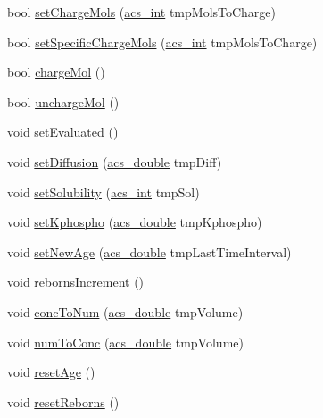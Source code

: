 \begin{DoxyCompactItemize}
\item 
bool \hyperlink{classspecies_a27f9852312659597efe7925124152286}{set\-Charge\-Mols} (\hyperlink{acs__headers_8h_a8d277355641a098190360234e2ebde35}{acs\-\_\-int} tmp\-Mols\-To\-Charge)
\item 
bool \hyperlink{classspecies_a088763fc6b6279040920d219f314c90e}{set\-Specific\-Charge\-Mols} (\hyperlink{acs__headers_8h_a8d277355641a098190360234e2ebde35}{acs\-\_\-int} tmp\-Mols\-To\-Charge)
\item 
bool \hyperlink{classspecies_adc36fb991695aed6503b8ed82e06bca5}{charge\-Mol} ()
\item 
bool \hyperlink{classspecies_acf8588148932adb86229eec28f7cde7c}{uncharge\-Mol} ()
\item 
void \hyperlink{classspecies_a089da38f8016bd588fa262cd836d1c4d}{set\-Evaluated} ()
\item 
void \hyperlink{classspecies_ab4b4adbc3c26e3a8c81a090c9d1330e3}{set\-Diffusion} (\hyperlink{acs__headers_8h_ab776853a005fcbf56af0424a2a4dd607}{acs\-\_\-double} tmp\-Diff)
\item 
void \hyperlink{classspecies_a27c2d0448e1f56e0962132d8d360fc07}{set\-Solubility} (\hyperlink{acs__headers_8h_a8d277355641a098190360234e2ebde35}{acs\-\_\-int} tmp\-Sol)
\item 
void \hyperlink{classspecies_a4d33fdb252e1884841f9c671ce25973c}{set\-Kphospho} (\hyperlink{acs__headers_8h_ab776853a005fcbf56af0424a2a4dd607}{acs\-\_\-double} tmp\-Kphospho)
\item 
void \hyperlink{classspecies_aa73ab15fb28aefd3b0c6b19e7c9bb944}{set\-New\-Age} (\hyperlink{acs__headers_8h_ab776853a005fcbf56af0424a2a4dd607}{acs\-\_\-double} tmp\-Last\-Time\-Interval)
\item 
void \hyperlink{classspecies_a90d5fc1d90637f2245e8b0ecf228ddfa}{reborns\-Increment} ()
\item 
void \hyperlink{classspecies_a9842732a5dbe0eb67e24148b5d7ae4a2}{conc\-To\-Num} (\hyperlink{acs__headers_8h_ab776853a005fcbf56af0424a2a4dd607}{acs\-\_\-double} tmp\-Volume)
\item 
void \hyperlink{classspecies_a23c19a53390142ba690d0f3db0520d05}{num\-To\-Conc} (\hyperlink{acs__headers_8h_ab776853a005fcbf56af0424a2a4dd607}{acs\-\_\-double} tmp\-Volume)
\item 
void \hyperlink{classspecies_a911d4db36e84690d19abb2902a734524}{reset\-Age} ()
\item 
void \hyperlink{classspecies_a4884d8bce59ddb79e87e08f3ed16633f}{reset\-Reborns} ()
\item 

\end{DoxyCompactItemize}
